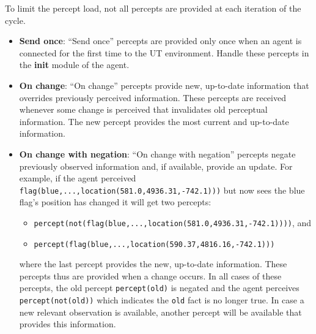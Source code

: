 \documentclass[11pt,a4paper]{article}
\begin{document}


To limit the percept load, not all percepts are provided at each iteration of the cycle. 
\begin{itemize}
\item \textbf{Send once}: ``Send once'' percepts are provided only once when an agent is connected for the first time to the UT environment. Handle these percepts in the \textbf{init} module of the agent.
\item \textbf{On change}: ``On change'' percepts provide new, up-to-date information that overrides previously perceived information. These percepts are received whenever some change is perceived that invalidates old perceptual information. The new percept provides the most current and up-to-date information.
\item \textbf{On change with negation}: ``On change with negation'' percepts negate previously observed information and, if available, provide an update. For example, if the agent perceived \texttt{flag(blue,...,location(581.0,4936.31,-742.1)))} but now sees the blue flag's position has changed it will get two percepts:
\begin{itemize}
	\item \texttt{percept(not(flag(blue,...,location(581.0,4936.31,-742.1))))}, and
	\item \texttt{percept(flag(blue,...,location(590.37,4816.16,-742.1)))}
\end{itemize} where the last percept provides the new, up-to-date information. These percepts thus are provided when a change occurs. In all cases of these percepts, the old percept \texttt{percept(old)} is negated and the agent perceives \texttt{percept(not(old))} which indicates the \texttt{old} fact is no longer true. In case a new relevant observation is available, another percept will be available that provides this information.
\end{itemize}
\end{document}
